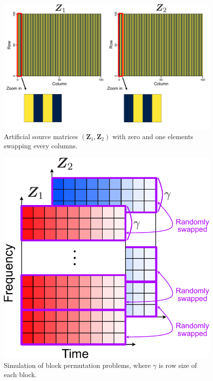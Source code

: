 \begin{figure}[t]
  \begin{center}
      \includegraphics[width=0.95\columnwidth]{figures/origi_spec/stripe.pdf}
  \end{center}
\caption{Artificial source matrices $(\bm{Z}_1, \bm{Z}_2)$ with zero and one elements swapping every columns.}
\label{fig:stripe_spec}
\end{figure}

\begin{figure}[t]
    \begin{center}
        \includegraphics[width=0.70\columnwidth]{figures/experiment_block_matrix.pdf}
    \end{center}
	\caption{Simulation of block permutation problems, where $\gamma$ is row size of each block.}
	\label{fig:ex_block}
\end{figure}


